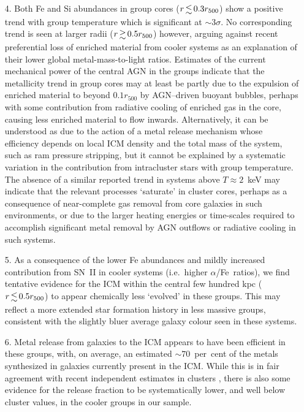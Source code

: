 \documentclass[useAMS,usenatbib]{mn2e}
\begin{document}
\begin{enumerate}
\item[4.] Both Fe and Si abundances in group cores ($r\la 0.3r_{500}$)
  show a positive trend with group temperature which is significant at
  $\sim 3\sigma$. No corresponding trend is seen at larger radii
  ($r\ga 0.5r_{500}$) however, arguing against recent preferential
  loss of enriched material from cooler systems as an explanation of
  their lower global metal-mass-to-light ratios. Estimates of the
  current mechanical power of the central AGN in the groups indicate
  that the metallicity trend in group cores may at least be partly due
  to the expulsion of enriched material to beyond $0.1r_{500}$ by
  AGN--driven buoyant bubbles, perhaps with some contribution from
  radiative cooling of enriched gas in the core, causing less enriched
  material to flow inwards. Alternatively, it can be understood as due
  to the action of a metal release mechanism whose efficiency depends
  on local ICM density and the total mass of the system, such as ram
  pressure stripping, but it cannot be explained by a systematic
  variation in the contribution from intracluster stars with group
  temperature. The absence of a similar reported trend in systems
  above $T \approx 2$~keV may indicate that the relevant processes
  `saturate' in cluster cores, perhaps as a consequence of
  near-complete gas removal from core galaxies in such environments,
  or due to the larger heating energies or time-scales required to
  accomplish significant metal removal by AGN outflows or radiative
  cooling in such systems.

\item[5.] As a consequence of the lower Fe abundances and mildly
  increased contribution from SN~II in cooler systems (i.e.\ higher
  $\alpha$/Fe~ratios), we find tentative evidence for the ICM within
  the central few hundred kpc ($r\la 0.5r_{500}$) to appear chemically
  less `evolved' in these groups. This may reflect a more extended
  star formation history in less massive groups, consistent with the
  slightly bluer average galaxy colour seen in these systems.
  
\item[6.] Metal release from galaxies to the ICM appears to have been
  efficient in these groups, with, on average, an estimated $\sim
  70$~per~cent of the metals synthesized in galaxies currently present
  in the ICM. While this is in fair agreement with recent independent
  estimates in clusters \citep{siva09}, there is also some evidence
  for the release fraction to be systematically lower, and well below
  cluster values, in the cooler groups in our sample.


\end{enumerate}
\end{document}
